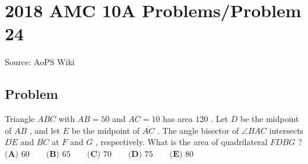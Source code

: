 \documentclass[12pt]{article}
\begin{document}
\section*{{2018 AMC 10A Problems/Problem 24}}
Source: AoPS Wiki

\subsection*{Problem}
Triangle $ABC$ with $AB=50$ and $AC=10$ has area $120$ . Let $D$ be the midpoint of $\overline{AB}$ , and let $E$ be the midpoint of $\overline{AC}$ . The angle bisector of $\angle BAC$ intersects $\overline{DE}$ and $\overline{BC}$ at $F$ and $G$ , respectively. What is the area of quadrilateral $FDBG$ ? $\textbf{(A) }60 \qquad \textbf{(B) }65 \qquad \textbf{(C) }70 \qquad \textbf{(D) }75 \qquad \textbf{(E) }80 \qquad$
\end{document}
